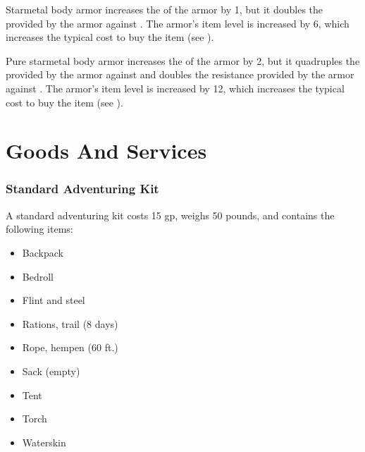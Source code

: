          Starmetal body armor increases the  of the armor by 1, but it doubles the  provided by the armor against .
        The armor's item level is increased by 6, which increases the typical cost to buy the item (see ).

         Pure starmetal body armor increases the  of the armor by 2, but it quadruples the  provided by the armor against  and doubles the resistance provided by the armor against .
        The armor's item level is increased by 12, which increases the typical cost to buy the item (see ).

\section{Goods And Services}

    \subsubsection{Standard Adventuring Kit}
        A standard adventuring kit costs 15 gp, weighs 50 pounds, and contains the following items:
        \begin{itemize}
            \item Backpack
            \item Bedroll
            \item Flint and steel
            \item Rations, trail (8 days)
            \item Rope, hempen (60 ft.)
            \item Sack (empty)
            \item Tent
            \item Torch
            \item Waterskin
        \end{itemize}

